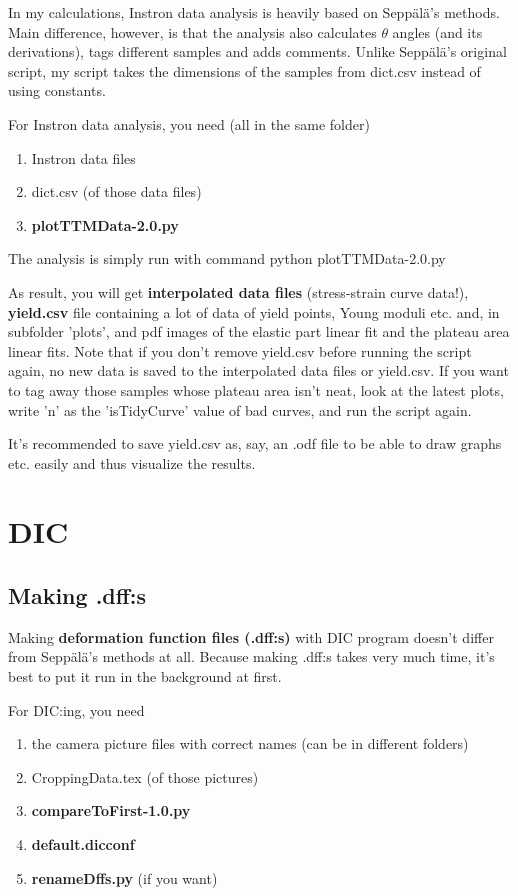 \documentclass[a4paper]{article}
\begin{document}
In my calculations, Instron data analysis is heavily based on Sepp\"{a}l\"{a}'s 
methods. Main difference, however, is that the analysis also calculates $\theta$ 
angles (and its derivations), tags different samples and adds comments. Unlike 
Sepp\"{a}l\"{a}'s original script, my script takes the dimensions of the samples 
from dict.csv instead of using constants.

For Instron data analysis, you need (all in the same folder)

\begin{enumerate}
\item Instron data files
\item dict.csv (of those data files)
\item \textbf{plotTTMData-2.0.py}
\end{enumerate}

The analysis is simply run with command \textsf{python plotTTMData-2.0.py}

As result, you will get \textbf{interpolated data files} (stress-strain curve 
data!), \textbf{yield.csv} file containing a lot of data of yield points, Young 
moduli etc. and, in subfolder 'plots', and pdf images of the elastic part linear 
fit and the plateau area linear fits. Note that if you don't remove yield.csv 
before running the script again, no new data is saved to the interpolated data 
files or yield.csv. If you want to tag away those samples whose plateau area isn't 
neat, look at the latest plots, write 'n' as the 'isTidyCurve' value of bad curves, 
and run the script again.

It's recommended to save yield.csv as, say, an .odf file to be able to draw graphs 
etc. easily and thus visualize the results.

\section{DIC}

\subsection{Making .dff:s}

Making \textbf{deformation function files (.dff:s)} with DIC program doesn't differ 
from Sepp\"{a}l\"{a}'s methods at all. Because making .dff:s takes very much time, 
it's best to put it run in the background at first.

For DIC:ing, you need 

\begin{enumerate}
\item the camera picture files with correct names (can be in different folders)
\item CroppingData.tex (of those pictures)
\item \textbf{compareToFirst-1.0.py}
\item \textbf{default.dicconf}
\item \textbf{renameDffs.py} (if you want)
\end{enumerate}
\end{document}
